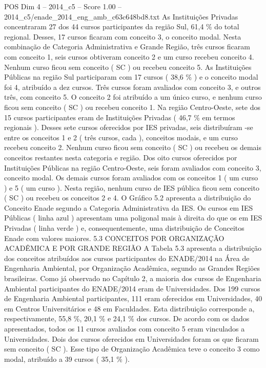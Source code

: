 \begin{textsample}{POS Dim 4 – 2014\_c5 – Score 1.00 – 2014\_c5/enade\_2014\_eng\_amb\_c63c648bd8.txt}
As Instituições Privadas concentraram 27 dos 44 cursos participantes da região Sul, 61,4 \% do total regional.
Desses, 17 cursos ficaram com conceito 3, o conceito modal.
Nesta combinação de Categoria Administrativa e Grande Região, três cursos ficaram com conceito 1, seis cursos obtiveram conceito 2 e um curso recebeu conceito 4.
Nenhum curso ficou sem conceito ( SC ) ou recebeu conceito 5.
As Instituições Públicas na região Sul participaram com 17 cursos ( 38,6 \% ) e o conceito modal foi 4, atribuído a dez cursos.
Três cursos foram avaliados com conceito 3, e outros três, com conceito 5.
O conceito 2 foi atribuído a um único curso, e nenhum curso ficou sem conceito ( SC ) ou recebeu conceito 1.
Na região Centro-Oeste, sete dos 15 cursos participantes eram de Instituições Privadas ( 46,7 \% em termos regionais ).
Desses sete cursos oferecidos por IES privadas, seis distribuíram -se entre os conceitos 1 e 2 ( três cursos, cada ), conceitos modais, e um curso recebeu conceito 2.
Nenhum curso ficou sem conceito ( SC ) ou recebeu os demais conceitos restantes nesta categoria e região.
Dos oito cursos oferecidos por Instituições Públicas na região Centro-Oeste, seis foram avaliados com conceito 3, conceito modal.
Os demais cursos foram avaliados com os conceitos 1 ( um curso ) e 5 ( um curso ).
Nesta região, nenhum curso de IES pública ficou sem conceito ( SC ) ou recebeu os conceitos 2 e 4.
O Gráfico 5.2 apresenta a distribuição do Conceito Enade segundo a Categoria Administrativa da IES.
Os cursos em IES Públicas ( linha azul ) apresentam uma poligonal mais à direita do que os em IES Privadas ( linha verde ) e, consequentemente, uma distribuição de Conceitos Enade com valores maiores. 5.3 CONCEITOS POR ORGANIZAÇÃO ACADÊMICA E POR GRANDE REGIÃO A Tabela 5.3 apresenta a distribuição dos conceitos atribuídos aos cursos participantes do ENADE/2014 na Área de Engenharia Ambiental, por Organização Acadêmica, segundo as Grandes Regiões brasileiras.
Como já observado no Capítulo 2, a maioria dos cursos de Engenharia Ambiental participantes do ENADE/2014 eram de Universidades.
Dos 199 cursos de Engenharia Ambiental participantes, 111 eram oferecidos em Universidades, 40 em Centros Universitários e 48 em Faculdades.
Esta distribuição corresponde a, respectivamente, 55,8 \%, 20,1 \% e 24,1 \% dos cursos.
De acordo com os dados apresentados, todos os 11 cursos avaliados com conceito 5 eram vinculados a Universidades.
Dois dos cursos oferecidos em Universidades foram os que ficaram sem conceito ( SC ).
Esse tipo de Organização Acadêmica teve o conceito 3 como modal, atribuído a 39 cursos ( 35,1 \% ).

\end{textsample}
